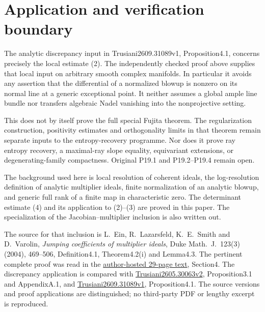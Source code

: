 \documentclass[11pt]{article}
\begin{document}
\section{Application and verification boundary}

The analytic discrepancy input in Trusiani2609.31089v1,
Proposition4.1, concerns precisely the local estimate (2).
The independently checked proof above supplies that local input
on arbitrary smooth complex manifolds. In particular it avoids any assertion that the
differential of a normalized blowup is nonzero on its normal
line at a generic exceptional point. It neither assumes a
global ample line bundle nor transfers algebraic Nadel
vanishing into the nonprojective setting.

This does not by itself prove the full special Fujita theorem.
The regularization construction, positivity estimates and
orthogonality limits in that theorem remain separate inputs
to the entropy-recovery programme. Nor does it prove ray
entropy recovery, a maximal-ray slope equality, equivariant
extensions, or degenerating-family compactness. Original P19.1
and P19.2--P19.4 remain open.

The background used here is local resolution of coherent
ideals, the log-resolution definition of analytic multiplier
ideals, finite normalization of an analytic blowup, and
generic full rank of a finite map in characteristic zero.
The determinant estimate (4) and its application to (2)--(3)
are proved in this paper. The specialization of the
Jacobian--multiplier inclusion is also written out.

The source for that inclusion is L.~Ein, R.~Lazarsfeld,
K.~E.~Smith and D.~Varolin, \emph{Jumping coefficients of
multiplier ideals}, Duke Math.~J.~123(3) (2004), 469--506,
Definition4.1, Theorem4.2(i) and Lemma4.3.
The pertinent complete proof was read in the
\href{https://www.math.stonybrook.edu/~dror/paper-jump.pdf}
{author-hosted 29-page text}, Section4.
The discrepancy application is compared with
\href{https://arxiv.org/pdf/2605.30063v2}{Trusiani2605.30063v2},
Proposition3.1 and AppendixA.1, and
\href{https://arxiv.org/pdf/2609.31089v1}{Trusiani2609.31089v1},
Proposition4.1.
The source versions and proof applications are distinguished;
no third-party PDF or lengthy excerpt is reproduced.
\end{document}
